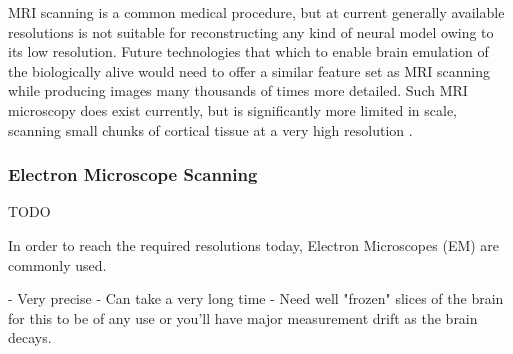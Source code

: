 MRI scanning is a common medical procedure, but at current generally available
resolutions is not suitable for reconstructing any kind of neural model owing to
its low resolution. Future technologies that which to enable brain emulation of
the biologically alive would need to offer a similar feature set as MRI scanning
while producing images many thousands of times more detailed. Such MRI
microscopy does exist currently, but is significantly more limited
in scale, scanning small chunks of cortical tissue at a very high resolution
\autocite{johnson_three-dimensional_1987,bostrom_whole_2008}.

\subsubsection*{Electron Microscope Scanning}

TODO

In order to reach the required resolutions today, Electron Microscopes (EM) are
commonly used. 

- Very precise
- Can take a very long time
- Need well "frozen" slices of the brain for this to be of any use or you'll
have major measurement drift as the brain decays.

